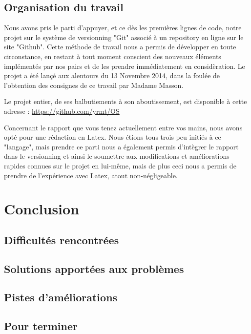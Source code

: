 \documentclass{report}
\begin{document}
{	\section{Organisation du travail}

		Nous avons pris le parti d'appuyer, et ce dès les premières lignes de code, notre projet sur le système de versionning "Git" associé
		à un repository en ligne sur le site "Github".
		Cette méthode de travail nous a permis de développer en toute circonstance, en restant à tout moment conscient des nouveaux éléments 
		implémentés par nos pairs et de les prendre immédiatement en considèration.
		Le projet a été lançé aux alentours du 13 Novembre 2014, dans la foulée de l'obtention des consignes de ce travail par Madame Masson.

		Le projet entier, de ses balbutiements à son aboutissement, est disponible à cette adresse : \url{https://github.com/yrmt/OS}

		Concernant le rapport que vous tenez actuellement entre vos mains, nous avons opté pour une rédaction en Latex.
		Nous étions tous trois peu initiés à ce "langage", mais prendre ce parti nous a également permis d'intègrer le rapport
		dans le versionning et ainsi le soumettre aux modifications et améliorations rapides connues sur le projet en lui-même, mais de plus
		ceci nous a permis de prendre de l'expérience avec Latex, atout non-négligeable.

\chapter{Conclusion}
	
	\section{Difficultés rencontrées}

	\section{Solutions apportées aux problèmes}

	\section{Pistes d'améliorations}

	\section{Pour terminer}

}
\end{document}
